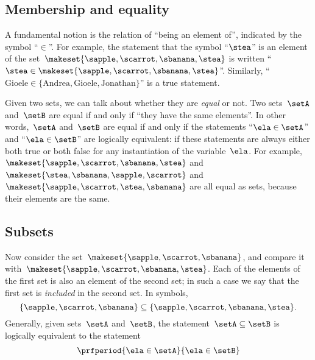 
\subsection{Membership and equality}

A fundamental notion is the relation of ``being an element of'', indicated by the symbol ``$\in$''.
For example, the statement that the symbol ``$\stea$'' is an element of the set~$\makeset{ \sapple, \scarrot, \sbanana, \stea }$ is written ``$\stea \in \makeset{ \sapple, \scarrot, \sbanana, \stea }$''.
Similarly, ``$\text{Gioele} \in \{ \text{Andrea}, \text{Gioele}, \text{Jonathan} \}$'' is a true statement.

Given  two sets, we can talk about whether they are \emph{equal} or not.
Two sets~$\setA$ and~$\setB$ are equal if and only if ``they have the same elements''.
In other words,~$\setA$ and~$\setB$ are equal if and only if the statements
``$\ela \in \setA$'' and ``$\ela \in \setB$'' are logically equivalent:
if these statements are always either both true or both false for any instantiation of the variable~$\ela$.
For example, $\makeset{ \sapple, \scarrot, \sbanana, \stea }$ and~$\makeset{ \stea, \sbanana, \sapple, \scarrot}$ and~$\makeset{ \sapple, \scarrot, \stea, \sbanana }$ are all equal as sets, because their elements are the same.


\subsection{Subsets}

Now consider the set~$\makeset{ \sapple, \scarrot, \sbanana }$, and compare it with~$\makeset{ \sapple, \scarrot, \sbanana, \stea }$.
Each of the elements of the first set is also an element of the second set;
in such a case we say that the first set is \emph{included} in the second set.
In symbols,
%
\begin{equation}
    \label{eq:subset}
    \{ \sapple, \scarrot, \sbanana \} \subseteq \{ \sapple, \scarrot, \sbanana, \stea \}.
\end{equation}
%
Generally, given sets~$\setA$ and~$\setB$, the statement~$\setA \subseteq \setB$ is logically equivalent to the statement
%
\begin{equation*}
    \prfperiod{
        \ela \in \setA
    }{
        \ela \in \setB
    }
\end{equation*}

